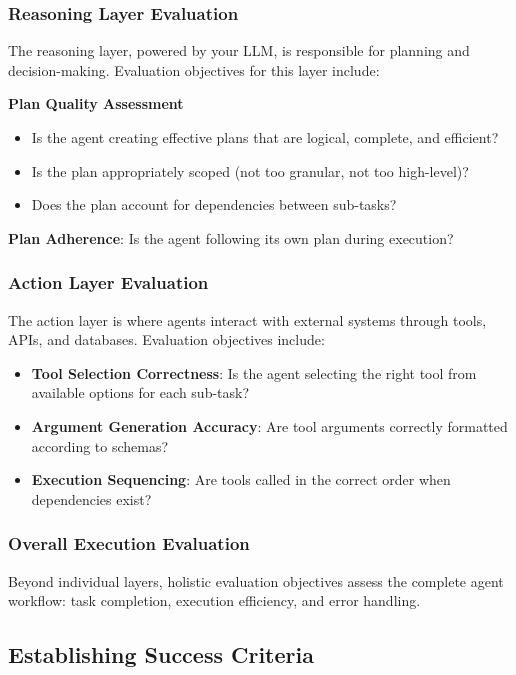 \begin{TNtwocol}
\subsubsection{Reasoning Layer Evaluation}
The reasoning layer, powered by your LLM, is responsible for planning and decision-making. Evaluation objectives for this layer include:

\textbf{Plan Quality Assessment}
\begin{itemize}
    \item Is the agent creating effective plans that are logical, complete, and efficient?
    \item Is the plan appropriately scoped (not too granular, not too high-level)?
    \item Does the plan account for dependencies between sub-tasks?
\end{itemize}
\textbf{Plan Adherence}: Is the agent following its own plan during execution?

\subsubsection{Action Layer Evaluation}
The action layer is where agents interact with external systems through tools, APIs, and databases. Evaluation objectives include:

\begin{itemize}
    \item \textbf{Tool Selection Correctness}: Is the agent selecting the right tool from available options for each sub-task?
    \item \textbf{Argument Generation Accuracy}: Are tool arguments correctly formatted according to schemas?
    \item \textbf{Execution Sequencing}: Are tools called in the correct order when dependencies exist?
\end{itemize}

\subsubsection{Overall Execution Evaluation}
Beyond individual layers, holistic evaluation objectives assess the complete agent workflow: task completion, execution efficiency, and error handling.

\subsection{Establishing Success Criteria}

\end{TNtwocol}
